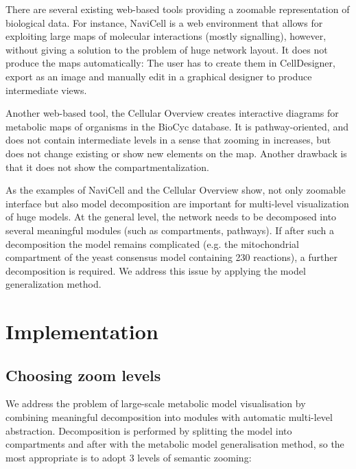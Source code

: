 \documentclass{bmcart}
\begin{document}
There are several existing web-based tools providing a zoomable representation of biological data. For instance, NaviCell\cite{Kuperstein2013} is a web environment that allows for exploiting large maps of molecular interactions (mostly signalling), however, without giving a solution to the problem of huge network layout. It does not produce the maps automatically: The user has to create them in CellDesigner, export as an image and manually edit in a graphical designer to produce intermediate views.

Another web-based tool, the Cellular Overview\cite{Latendresse2011} creates interactive diagrams for metabolic maps of organisms in the BioCyc database\cite{Caspi2012}. It is pathway-oriented, and does not contain intermediate levels in a sense that zooming in increases, but does not change existing or show new elements on the map. Another drawback is that it does not show the compartmentalization.

As the examples of NaviCell and the Cellular Overview show, not only zoomable interface but also model decomposition are important for multi-level visualization of huge models. At the general level, the network needs to be decomposed into several meaningful modules (such as compartments, pathways). If after such a decomposition the model remains complicated (e.g. the mitochondrial compartment of the yeast consensus model\cite{Heavner12} containing 230 reactions), a further decomposition is required. We address this issue by applying the model generalization method.


\section*{Implementation}

\subsection*{Choosing zoom levels}
We address the problem of large-scale metabolic model visualisation by combining meaningful decomposition into modules with automatic multi-level abstraction. Decomposition is performed by splitting the model into compartments and after with the metabolic model generalisation method, so the most appropriate is to adopt 3 levels of semantic zooming:
\end{document}
